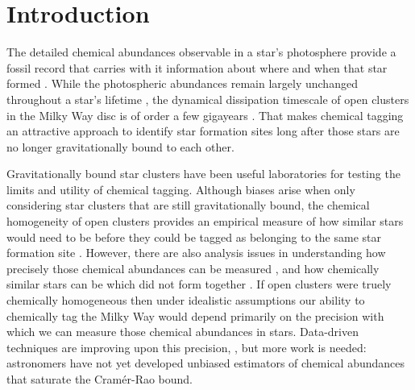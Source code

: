\documentclass[twocolumn]{aastex62}
\begin{document}

\section{Introduction} \label{sec:intro}

The detailed chemical abundances observable in a star's photosphere provide a
fossil record that carries with it information about where and when that star
formed \citep{Freeman;Bland-Hawthorn:2002}. While the photospheric abundances remain largely unchanged throughout
a star's lifetime \citep[however see][]{Dotter:2017,Ness:2018b}, the dynamical 
dissipation timescale of open clusters in the Milky Way disc is of order a few 
gigayears \citep{Portegies-Zwart:1998}. That makes chemical tagging an attractive 
approach to identify star formation sites long after those stars are no longer 
gravitationally bound to each other.


Gravitationally bound star clusters have been useful laboratories for
testing the limits and utility of chemical tagging. Although biases arise when
only considering star clusters that are still gravitationally bound, the chemical
homogeneity of open clusters provides an empirical measure of how similar stars
would need to be before they could be tagged as belonging to the same
star formation site \citep{Mitschang:2014}. However, there are also analysis
issues in understanding how precisely those chemical abundances can be measured
\citep{Bovy:2016}, and how chemically similar stars can be which did not form 
together \citep[doppleg\"angers;][]{Ness:2018}.
If open clusters were truely chemically homogeneous then under idealistic 
assumptions our ability to chemically tag the Milky Way would depend primarily
on the precision with which we can measure those chemical abundances in stars. 
Data-driven techniques are
improving upon this precision, \citep{Ness:2015,Ness:2018a,Ness:2018b,
Casey:2016,Casey:2017,Ho:2017b,Ho:2017a,Leung;Bovy:2018}, but more work is
needed: astronomers have not yet developed unbiased estimators of chemical
abundances that saturate the Cram\'er-Rao bound.
\end{document}

